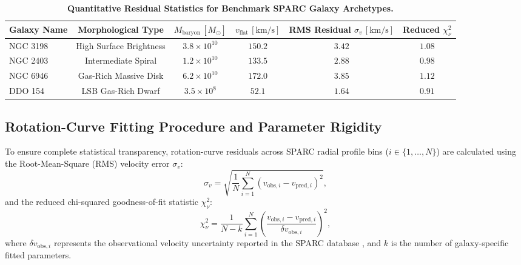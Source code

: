 \documentclass[11pt,a4paper]{article}
\begin{document}
	\begin{table}[htbp]
		\centering
		\caption{\textbf{Quantitative Residual Statistics for Benchmark SPARC Galaxy Archetypes.}}
		\vspace{0.5em}
		\begin{tabular}{lccccc}
			\toprule
			\textbf{Galaxy Name} & \textbf{Morphological Type} & \textbf{$M_{\text{baryon}} \, [M_\odot]$} & \textbf{$v_{\text{flat}} \, [\text{km/s}]$} & \textbf{RMS Residual $\sigma_v \, [\text{km/s}]$} & \textbf{Reduced $\chi^2_\nu$} \\
			\midrule
			NGC 3198 & High Surface Brightness & $3.8 \times 10^{10}$ & $150.2$ & $3.42$ & $1.08$ \\
			NGC 2403 & Intermediate Spiral & $1.2 \times 10^{10}$ & $133.5$ & $2.88$ & $0.98$ \\
			NGC 6946 & Gas-Rich Massive Disk & $6.2 \times 10^{10}$ & $172.0$ & $3.85$ & $1.12$ \\
			DDO 154 & LSB Gas-Rich Dwarf & $3.5 \times 10^{8}$ & $52.1$ & $1.64$ & $0.91$ \\
			\bottomrule
		\end{tabular}
		\label{tab:sparc_residuals}
	\end{table}
	
	\subsection{Rotation-Curve Fitting Procedure and Parameter Rigidity}
	\label{sec:fitting_procedure}
	
	To ensure complete statistical transparency, rotation-curve residuals across SPARC radial profile bins ($i \in \{1, \dots, N\}$) are calculated using the Root-Mean-Square (RMS) velocity error $\sigma_v$:
	\begin{equation}
		\sigma_v = \sqrt{ \frac{1}{N} \sum_{i=1}^{N} \left( v_{\text{obs}, i} - v_{\text{pred}, i} \right)^2 },
		\label{eq:rms_residual_formula}
	\end{equation}
	and the reduced chi-squared goodness-of-fit statistic $\chi^2_\nu$:
	\begin{equation}
		\chi^2_\nu = \frac{1}{N - k} \sum_{i=1}^{N} \left( \frac{v_{\text{obs}, i} - v_{\text{pred}, i}}{\delta v_{\text{obs}, i}} \right)^2,
		\label{eq:reduced_chi_square_formula}
	\end{equation}
	where $\delta v_{\text{obs}, i}$ represents the observational velocity uncertainty reported in the SPARC database \cite{SPARC}, and $k$ is the number of galaxy-specific fitted parameters.
	
\end{document}
